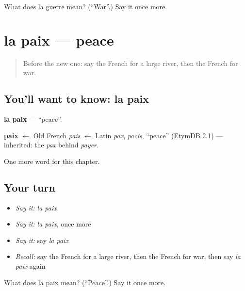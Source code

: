 \begin{tcolorbox}[breakable,colback=teal!4,colframe=teal!35!black,title={Before you move on}]
What does la guerre mean? (\textquotedblleft{}War\textquotedblright{}.) Say it once more.
\end{tcolorbox}
\section[la paix]{la paix — peace}

\label{lesson:FR-C165-paix}



\begin{quote}
Before the new one: say the French for a large river, then the French for war.
\end{quote}

\subsection*{You'll want to know: la paix}
\textbf{la paix} — \textquotedblleft{}peace\textquotedblright{}.

\begin{cousinweb}
\textbf{paix} $\leftarrow$ Old French \emph{pais} $\leftarrow$ Latin \emph{pax}, \emph{pacis}, \textquotedblleft{}peace\textquotedblright{} (EtymDB 2.1) — inherited: the \emph{pax} behind \emph{payer}.
\end{cousinweb}

\begin{grammarlens}[title={What you've built}]
One more word for this chapter.
\end{grammarlens}

\subsection*{Your turn}
\begin{itemize}
\raggedright
  \item \emph{Say it:} \emph{la paix}
  \item \emph{Say it:} \emph{la paix}, once more
  \item \emph{Say it:} say \emph{la paix}
  \item \emph{Recall:} say the French for a large river, then the French for war, then say \emph{la paix} again
\end{itemize}

\begin{tcolorbox}[breakable,colback=teal!4,colframe=teal!35!black,title={Before you move on}]
What does la paix mean? (\textquotedblleft{}Peace\textquotedblright{}.) Say it once more.
\end{tcolorbox}
